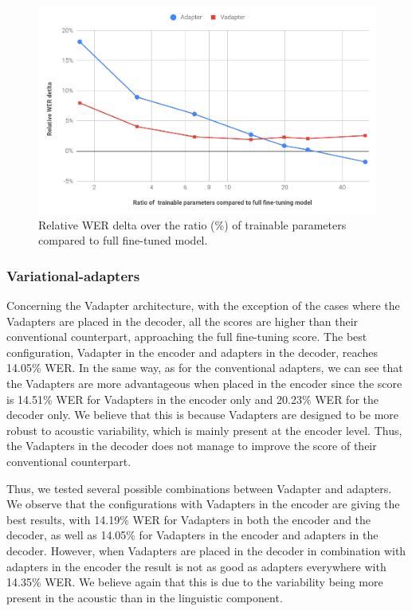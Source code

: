 \begin{figure}[t]
\begin{center}
\includegraphics[scale=0.3]{imgs/ratio_delta.png}
\caption{Relative WER delta over the ratio (\%) of trainable parameters compared to full fine-tuned model.}
\label{fig:ratio}
\end{center}
\end{figure}
\vspace{-0.35cm}
\subsubsection{Variational-adapters}
Concerning the Vadapter architecture, with the exception of the cases where the Vadapters are placed in the decoder, all the scores are higher than their conventional counterpart, approaching the full fine-tuning score. The best configuration, Vadapter in the encoder and adapters in the decoder, reaches 14.05\% WER. In the same way, as for the conventional adapters, we can see that the Vadapters are more advantageous when placed in the encoder since the score is 14.51\% WER for Vadapters in the encoder only and 20.23\% WER for the decoder only. We believe that this is because Vadapters are designed to be more robust to acoustic variability, 
which is mainly present at the encoder level. Thus, the Vadapters in the decoder does not manage to improve the score of their conventional counterpart. 

Thus, we tested several possible combinations between Vadapter and adapters. We observe that the configurations with Vadapters in the encoder are giving the best results, with 14.19\% WER for Vadapters in both the encoder and the decoder, as well as 14.05\% for Vadapters in the encoder and adapters in the decoder. However, when Vadapters are placed in the decoder in combination with adapters in the encoder the result is not as good as adapters everywhere with 14.35\% WER. We believe again that this is due to the variability being more present in the acoustic than in the linguistic component.

